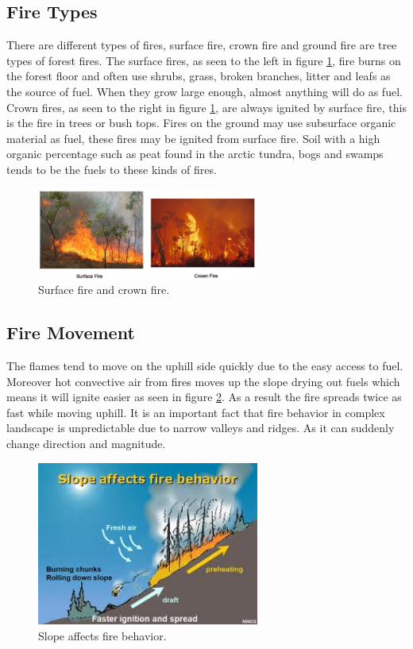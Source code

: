 \subsection{Fire Types}
There are different types of fires, surface fire, crown fire and ground fire are tree types of forest fires. The surface fires, as seen to the left in figure \ref{fig:fire-types}, fire burns on the forest floor and often use shrubs, grass, broken branches, litter and leafs as the source of fuel. When they grow large enough, almost anything will do as fuel. Crown fires, as seen to the right in figure \ref{fig:fire-types}, are always ignited by surface fire, this is the fire in trees or bush tops. Fires on the ground may use subsurface organic material as fuel, these fires may be ignited from surface fire. Soil with a high organic percentage such as peat found in the arctic tundra, bogs and swamps tends to be the fuels to these kinds of fires.
\begin{figure}[here]
  \centering
      \includegraphics[width=0.65\textwidth]{theory/graphics/fire-types.png}
  \caption{Surface fire and crown fire. \cite{firebev} }
  \label{fig:fire-types}
\end{figure}
\subsection{Fire Movement}
The flames tend to move on the uphill side quickly due to the easy access to fuel. Moreover hot convective air from fires moves up the slope drying out fuels which means it will ignite easier as seen in figure \ref{fig:fire-slope}. As a result the fire spreads twice as fast while moving uphill. It is an important fact that fire behavior in complex landscape is unpredictable due to narrow valleys and ridges. As it can suddenly change direction and magnitude. \cite{firemov}
\begin{figure}[here]
  \centering
      \includegraphics[width=0.65\textwidth]{theory/graphics/fire-slope.jpg}
  \caption{Slope affects fire behavior.  \cite{fireslope} }
  \label{fig:fire-slope}
\end{figure}
